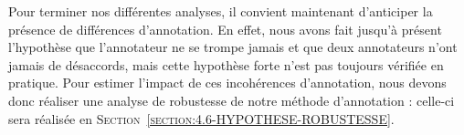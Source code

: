 		Pour terminer nos différentes analyses, il convient maintenant d'anticiper la présence de différences d'annotation.
		En effet, nous avons fait jusqu'à présent l'hypothèse que l'annotateur ne se trompe jamais et que deux annotateurs n'ont jamais de désaccords, mais cette hypothèse forte n'est pas toujours vérifiée en pratique.
		Pour estimer l'impact de ces incohérences d'annotation, nous devons donc réaliser une analyse de robustesse de notre méthode d'annotation : celle-ci sera réalisée en \textsc{Section~\ref{section:4.6-HYPOTHESE-ROBUSTESSE}}.